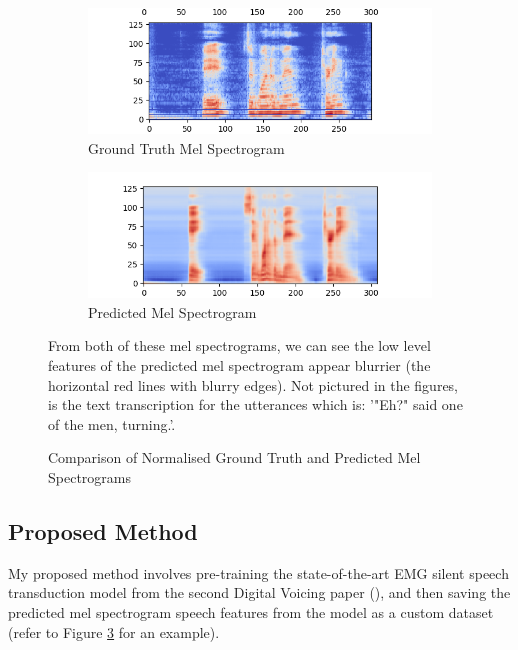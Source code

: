 \begin{figure}
  \centering
  \begin{subfigure}{.5\textwidth}
    \centering
    \includegraphics[width=1.\linewidth]{graphics/mel_vs_pred/ideal/458_g.png}
    \caption{Ground Truth Mel Spectrogram}
    \label{fig:sub1}
  \end{subfigure}%
  \begin{subfigure}{.5\textwidth}
    \centering
    \includegraphics[width=1\linewidth]{graphics/mel_vs_pred/ideal/458_p.png}
    \caption{Predicted Mel Spectrogram}
    \label{fig:sub2}
  \end{subfigure}
  \caption{Comparison of Normalised Ground Truth and Predicted Mel Spectrograms}
  \label{fig:ideal-gt-vs-pred-mel}
  From both of these mel spectrograms, we can see the low level features
  of the predicted mel spectrogram appear blurrier (the horizontal red lines
  with blurry edges).
  Not pictured in the figures, is
  the text transcription for the utterances which is: '"Eh?" said one of the men, turning.'.
\end{figure}

\subsection{Proposed Method}

My proposed method involves pre-training the state-of-the-art EMG silent speech
transduction model from the second Digital Voicing paper (\cite{gaddy2021improved}),
and then saving the predicted mel spectrogram speech features from the model as a
custom dataset (refer to Figure \ref{fig:ideal-gt-vs-pred-mel} for an example).

